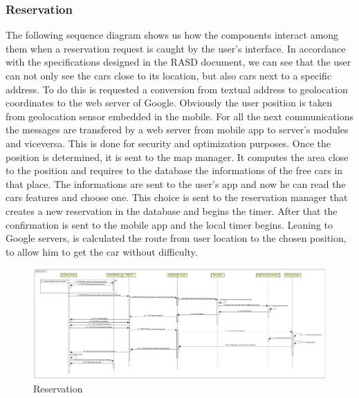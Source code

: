 \documentclass[english]{article}
\begin{document}
		\subsubsection{Reservation}
		The following sequence diagram shows us how the components interact among them when a reservation request is caught by the user's interface.
		In accordance with the specifications designed in the RASD document, we can see that the user can not only see the cars close to its location, but also cars next to a specific address. To do this is requested a conversion from textual address to geolocation coordinates to the web server of Google. Obviously the user position is taken from geolocation sensor embedded in the mobile.
		For all the next communications the messages are transfered by a web server from mobile app to server's modules and viceversa. This is done for security and optimization purposes.
		Once the position is determined, it is sent to the map manager. It computes the area close to the position and requires to the database the informations of the free cars in that place.
		The informations are sent to the user's app and now he can read the cars features and choose one.
		This choice is sent to the reservation manager that creates a new reservation in the database and begins the timer.
		After that the confirmation is sent to the mobile app and the local timer begins.
		Leaning to Google servers, is calculated the route from user location to the chosen position, to allow him to get the car without difficulty.
	\begin{landscape}
		\begin{figure}[H]
				\centering
				\includegraphics[scale=0.174]{./SequenceDiagrams/Reservation/Reservation.pdf}%
				\caption{Reservation}
		\end{figure}
	\end{landscape}
\end{document}
